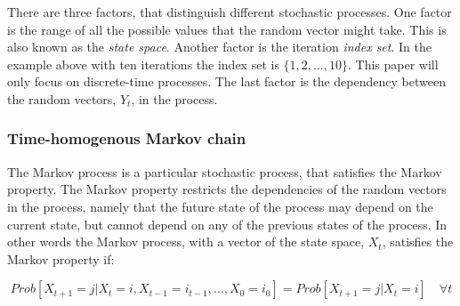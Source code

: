 \documentclass[preprint, 12pt]{elsarticle}
\begin{document}
There are three factors, that distinguish different stochastic processes. One factor is the range of all the possible values that the random vector might take. This is also known as the \emph{state space}. Another factor is the iteration \emph{index set}. In the example above with ten iterations the index set is $\{1, 2, \dots, 10\}$. This paper will only focus on discrete-time processes. The last factor is the dependency between the random vectors, $Y_t$, in the process.

\subsubsection{Time-homogenous Markov chain}

The Markov process is a particular stochastic process, that satisfies the Markov property. The Markov property restricts the dependencies of the random vectors in the process, namely that the future state of the process may depend on the current state, but cannot depend on any of the previous states of the process. In other words the Markov process, with a vector of the state space, $X_t$, satisfies the Markov property if:

\begin{equation}
Prob\left[ {X_{t+1} = j} \left| {X_t = i, X_{t-1} = i_{t-1}, \dots, X_0 = i_0} \right. \right] = Prob\left[ {X_{t+1} = j} \left| {X_t = i} \right. \right] \quad \forall t
\end{equation}
\end{document}
